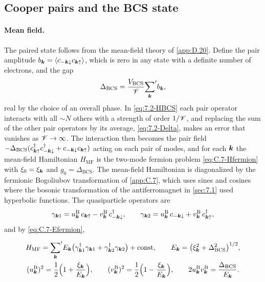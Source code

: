 \subsection{Cooper pairs and the BCS state}

\paragraph{Mean field.} The paired state follows from the mean-field theory of \cref{app:D.20}. Define the pair amplitude $b_{\bm{k}} = \langle c_{-\bm{k}\downarrow}c_{\bm{k}\uparrow}\rangle$, which is zero in any state with a definite number of electrons, and the gap
\begin{equation}
  \Delta_{\mathrm{BCS}} = \frac{V_{\mathrm{BCS}}}{\mathscr{V}}{\sum_{\bm{k}}}'b_{\bm{k}} ,
  \label{eq:7.2-Delta}
\end{equation}
real by the choice of an overall phase. In \cref{eq:7.2-HBCS} each pair operator interacts with all $\sim N$ others with a strength of order $1/\mathscr{V}$, and replacing the sum of the other pair operators by its average, \cref{eq:7.2-Delta}, makes an error that vanishes as $\mathscr{V} \to \infty$. The interaction then becomes the pair field $-\Delta_{\mathrm{BCS}}(c^\dagger_{\bm{k}\uparrow}c^\dagger_{-\bm{k}\downarrow} + c_{-\bm{k}\downarrow}c_{\bm{k}\uparrow})$ acting on each pair of modes, and for each $\bm{k}$ the mean-field Hamiltonian $H_{\mathrm{MF}}$ is the two-mode fermion problem \cref{eq:C.7-Hfermion} with $\xi_0 = \xi_{\bm{k}}$ and $g_0 = \Delta_{\mathrm{BCS}}$. The mean-field Hamiltonian is diagonalized by the fermionic Bogoliubov transformation of \cref{app:C.7}, which uses sines and cosines where the bosonic transformation of the antiferromagnet in \cref{sec:7.1} used hyperbolic functions. The quasiparticle operators are
\begin{equation}
  \gamma_{\bm{k}1} = u^{\mathrm{B}}_{\bm{k}}\,c_{\bm{k}\uparrow} - v^{\mathrm{B}}_{\bm{k}}\,c^\dagger_{-\bm{k}\downarrow}, \qquad
  \gamma_{\bm{k}2} = u^{\mathrm{B}}_{\bm{k}}\,c_{-\bm{k}\downarrow} + v^{\mathrm{B}}_{\bm{k}}\,c^\dagger_{\bm{k}\uparrow} ,
  \label{eq:7.2-gamma}
\end{equation}
and by \cref{eq:C.7-Efermion},
\begin{keyresult}
\begin{equation}
  \begin{gathered}
  H_{\mathrm{MF}} = {\sum_{\bm{k}}}'E_{\bm{k}}\bigl(\gamma^\dagger_{\bm{k}1}\gamma_{\bm{k}1} + \gamma^\dagger_{\bm{k}2}\gamma_{\bm{k}2}\bigr) + \text{const}, \qquad
  E_{\bm{k}} = \bigl(\xi_{\bm{k}}^2 + \Delta_{\mathrm{BCS}}^2\bigr)^{1/2}, \\
  (u^{\mathrm{B}}_{\bm{k}})^2 = \frac12\Bigl(1 + \frac{\xi_{\bm{k}}}{E_{\bm{k}}}\Bigr), \qquad
  (v^{\mathrm{B}}_{\bm{k}})^2 = \frac12\Bigl(1 - \frac{\xi_{\bm{k}}}{E_{\bm{k}}}\Bigr), \qquad
  2u^{\mathrm{B}}_{\bm{k}}v^{\mathrm{B}}_{\bm{k}} = \frac{\Delta_{\mathrm{BCS}}}{E_{\bm{k}}} .
  \end{gathered}
  \label{eq:7.2-E}
\end{equation}
\end{keyresult}
